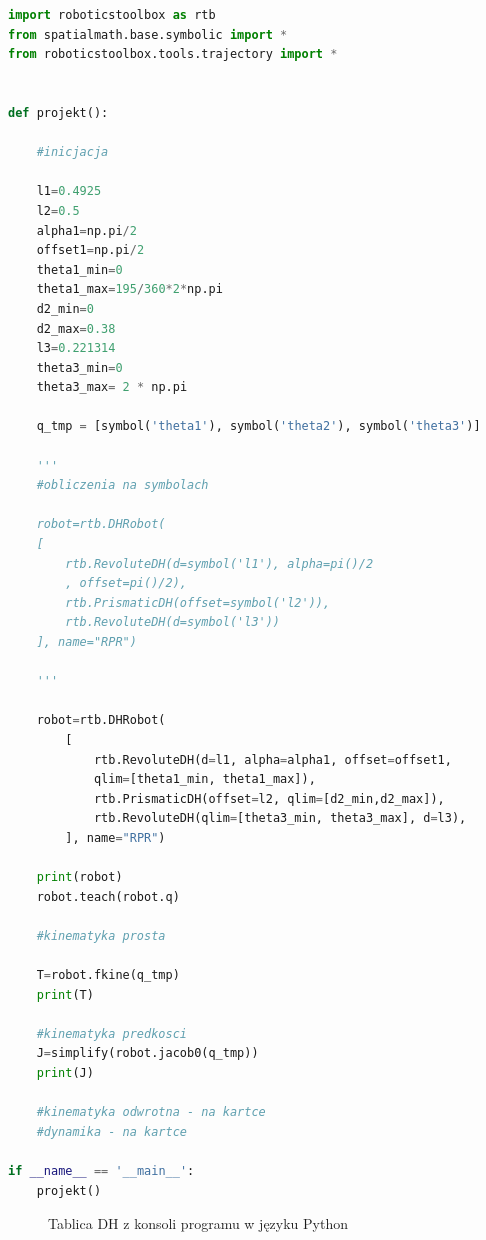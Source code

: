 \begin{lstlisting}[language=Python]
import roboticstoolbox as rtb
from spatialmath.base.symbolic import *
from roboticstoolbox.tools.trajectory import *


def projekt():

    #inicjacja

    l1=0.4925
    l2=0.5
    alpha1=np.pi/2
    offset1=np.pi/2
    theta1_min=0
    theta1_max=195/360*2*np.pi
    d2_min=0
    d2_max=0.38
    l3=0.221314
    theta3_min=0
    theta3_max= 2 * np.pi

    q_tmp = [symbol('theta1'), symbol('theta2'), symbol('theta3')]

    '''
    #obliczenia na symbolach
    
    robot=rtb.DHRobot(
    [
        rtb.RevoluteDH(d=symbol('l1'), alpha=pi()/2
        , offset=pi()/2),
        rtb.PrismaticDH(offset=symbol('l2')),
        rtb.RevoluteDH(d=symbol('l3'))
    ], name="RPR")
    
    '''

    robot=rtb.DHRobot(
        [
            rtb.RevoluteDH(d=l1, alpha=alpha1, offset=offset1, 
            qlim=[theta1_min, theta1_max]),
            rtb.PrismaticDH(offset=l2, qlim=[d2_min,d2_max]),
            rtb.RevoluteDH(qlim=[theta3_min, theta3_max], d=l3),
        ], name="RPR")

    print(robot)
    robot.teach(robot.q)

    #kinematyka prosta

    T=robot.fkine(q_tmp)
    print(T)

    #kinematyka predkosci
    J=simplify(robot.jacob0(q_tmp))
    print(J)

    #kinematyka odwrotna - na kartce
    #dynamika - na kartce

if __name__ == '__main__':
    projekt()

\end{lstlisting}

\begin{figure}[H]
	\centering
	\caption{Tablica DH z konsoli programu w języku Python} 
\end{figure}

